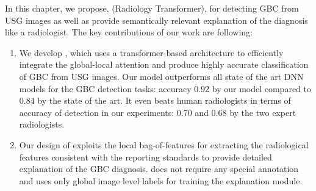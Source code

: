 \par In this chapter, we propose, \radformer (Radiology Transformer), for detecting GBC from USG images as well as provide semantically relevant explanation of the diagnosis like a radiologist. The key contributions of our work are following:
\begin{enumerate}
	\item We develop \radformer, which uses a transformer-based architecture to efficiently integrate the global-local attention and produce highly accurate classification of GBC from USG images. Our model outperforms all state of the art DNN models for the GBC detection tasks: accuracy 0.92 by our model compared to 0.84 by the state of the art. It even beats human radiologists in terms of accuracy of detection in our experiments: 0.70 and 0.68 by the two expert radiologists.
	\item Our design of \radformer exploits the local bag-of-features for extracting the radiological features consistent with the reporting standards to provide detailed explanation of the GBC diagnosis. \radformer does not require any special annotation and uses only global image level labels for training the explanation module.
\end{enumerate}

